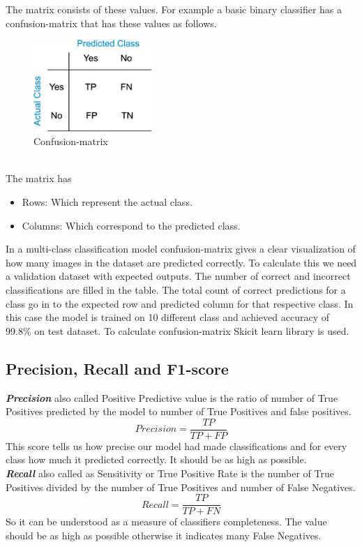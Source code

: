 The matrix consists of these values. For example a basic binary classifier has a confusion-matrix that has these values as follows.
\begin{figure}[h]
    \centering
    \includegraphics[width=0.4\textwidth]{thesis_template/images/con1.png}
    \caption{\small Confusion-matrix}
    \label{}
    \end{figure}\\
The matrix has
\begin{itemize}
    \item Rows: Which represent the actual class.
    \item Columns: Which correspond to the predicted class.
\end{itemize}
\noindent In a multi-class classification model confusion-matrix gives a clear visualization of how many images in the dataset are predicted correctly. To calculate this we need a validation dataset with expected outputs. 
 The number of correct and incorrect classifications are filled in the table. The total count of correct predictions for a class go in to the expected row and predicted column for that respective class. In this case the model is trained on 10 different class and achieved accuracy of 99.8\% on test dataset. To calculate confusion-matrix Skicit learn library is used. 


 \subsection{Precision, Recall and F1-score}
 
\textit{\textbf{Precision}} also called Positive Predictive value is the ratio of number of True Positives predicted by the model to number of True Positives and false positives. 
$$ Precision = \frac{TP}{TP+FP}$$
This score tells us how precise our model had made classifications and for every class how much it predicted correctly. It should be as high as possible. \\

\noindent \textit{\textbf{Recall}} also called as Sensitivity or True Positive Rate is the number of True Positives divided by the number of True Positives and number of False Negatives. 
$$ Recall = \frac{TP}{TP+FN}$$
So it can be understood as a measure of classifiers completeness. The value should be as high as possible otherwise it indicates many False Negatives.


